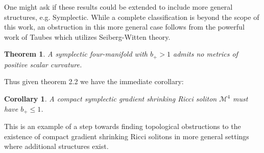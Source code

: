 \documentclass[openany, amssymb, psamsfonts]{amsart}
\newtheorem{thm}{Theorem}[section]
\newtheorem{cor}{Corollary}[section]
\theoremstyle{definition}
\numberwithin{equation}{section}
\begin{document}
One might ask if these results could be extended to include more general structures, e.g. Symplectic. While a complete classification is beyond the scope of this work, an obstruction in this more general case follows from the powerful work of Taubes \cite{taubes} which utilizes Seiberg-Witten theory.

\begin{thm} A symplectic four-manifold with $b_+ > 1$ admits no metrics of positive scalar curvature. 
\end{thm}

Thus given theorem 2.2 we have the immediate corollary:

\begin{cor}
A compact symplectic gradient shrinking Ricci soliton $\mathcal{M}^4$ must have $b_+ \leq 1$. 
\end{cor}

This is an example of a step towards finding topological obstructions to the existence of compact gradient shrinking Ricci solitons in more general settings where additional structures exist. 
\end{document}

